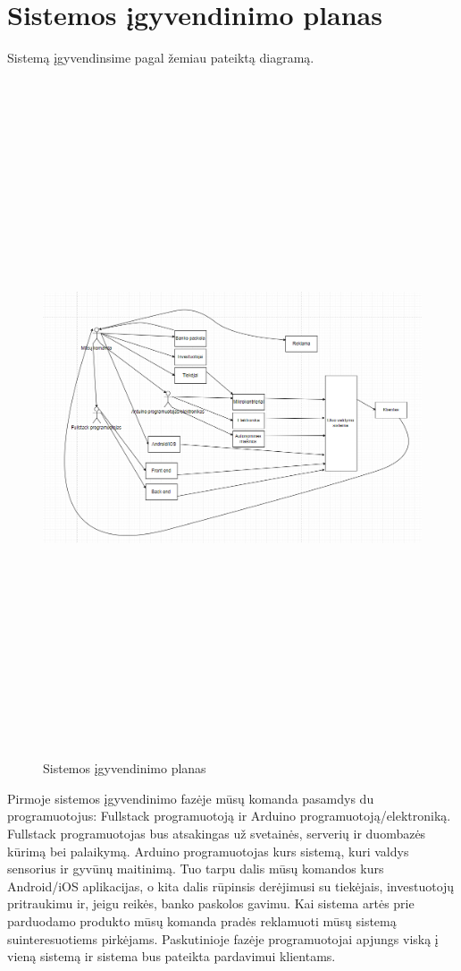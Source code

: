 \documentclass[oneside]{VUMIFPSkursinis}
\begin{document}
\section{Sistemos įgyvendinimo planas}
Sistemą įgyvendinsime pagal žemiau pateiktą diagramą. 
\begin{figure}[H]
		\centering	
	\includegraphics[width=18cm,height=20cm,keepaspectratio]{SistemosIgyvendinimas.png}
	\caption{Sistemos įgyvendinimo planas}
	\label{fig:Sistemos įgyvendinimo planas}
\end{figure}
Pirmoje sistemos įgyvendinimo fazėje mūsų komanda pasamdys du programuotojus: Fullstack programuotoją ir Arduino programuotoją/elektroniką. Fullstack programuotojas bus atsakingas už svetainės, serverių ir duombazės kūrimą bei palaikymą. Arduino programuotojas kurs sistemą, kuri valdys sensorius ir gyvūnų maitinimą. Tuo tarpu dalis mūsų komandos kurs Android/iOS aplikacijas, o kita dalis rūpinsis derėjimusi su tiekėjais, investuotojų pritraukimu ir, jeigu reikės, banko paskolos gavimu. Kai sistema artės prie parduodamo produkto mūsų komanda pradės reklamuoti mūsų sistemą suinteresuotiems pirkėjams. Paskutinioje fazėje programuotojai apjungs viską į vieną sistemą ir sistema bus pateikta pardavimui klientams. 
\end{document}
